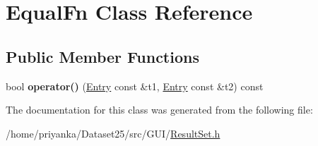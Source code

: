 \hypertarget{classEqualFn}{\section{\-Equal\-Fn \-Class \-Reference}
\label{classEqualFn}
}
\subsection*{\-Public \-Member \-Functions}
\begin{DoxyCompactItemize}
\item 
\hypertarget{classEqualFn_a560a68e974ac2f072925200a3a82c010}{bool {\bfseries operator()} (\hyperlink{classEntry}{\-Entry} const \&t1, \hyperlink{classEntry}{\-Entry} const \&t2) const }\label{classEqualFn_a560a68e974ac2f072925200a3a82c010}

\end{DoxyCompactItemize}


\-The documentation for this class was generated from the following file\-:\begin{DoxyCompactItemize}
\item 
/home/priyanka/\-Dataset25/src/\-G\-U\-I/\hyperlink{ResultSet_8h}{\-Result\-Set.\-h}\end{DoxyCompactItemize}
